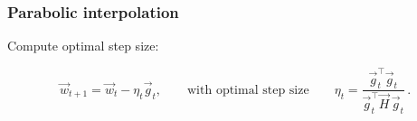 \begin{frame}\frametitle{Parabolic interpolation}


Compute optimal step size:

\begin{equation}
	  \vec{w}_{t+1} = \vec{w}_t - \eta_{t} \vec{g}_t,
	  \qquad \text{with optimal step size} \qquad
	  \eta_{t} = \frac{\vec{g}_t^\top\vec{g}_t}{\vec{g}_t^\top\vec{H}\,\vec{g}_t} \,.
\end{equation}

\end{frame}

